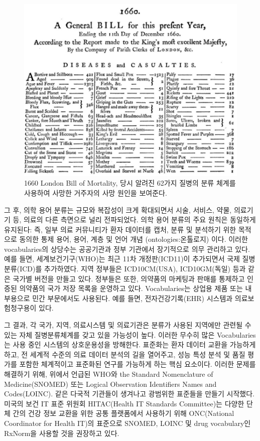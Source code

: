 \documentclass[11pt]{book}
\theoremstyle{definition}
\theoremstyle{definition}
\theoremstyle{definition}
\theoremstyle{remark}
\begin{document}
\begin{figure}

{\centering \includegraphics[width=1\linewidth]{images/StandardizedVocabularies/bill} 

}

\caption{1660 London Bill of Mortality, 당시 알려진 62가지 질병의 분류 체계를 사용하여 사망한 거주자의 사망 원인을 보여준다.}\label{fig:bill}
\end{figure}

그 후, 의학 용어 분류는 규모와 복잡성이 크게 확대되면서 시술, 서비스,
약물, 의료기기 등, 의료의 다른 측면으로 널리 전파되었다. 의학 용어
분류의 주요 원칙은 동일하게 유지된다: 즉, 일부 의료 커뮤니티가 환자
데이터를 캡처, 분류 및 분석하기 위한 목적으로 동의한 통제 용어, 용어,
계층 및 언어 개념 (ontologies:온톨로지) 이다. 이러한 vocabularies의
상당수는 공공기관과 정부 기관에서 장기적으로 의무 관리하고 있다. 예를
들면, 세계보건기구(WHO)는 최근 11차 개정판(ICD11)이 추가되면서 국제
질병분류(ICD)를 추가하였다. 지역 정부들은 ICD10CM(USA), ICD10GM(독일)
등과 같은 국가별 버전을 만들고 있다. 정부들은 또한, 의약품의 마케팅과
판매를 통제하고 인증된 의약품의 국가 저장 목록을 운영하고 있다.
Vocabularies는 상업용 제품 또는 내부용으로 민간 부문에서도 사용된다.
예를 들면, 전자건강기록(EHR) 시스템과 의료보험청구용이 있다.

그 결과, 각 국가, 지역, 의료시스템 및 의료기관은 분류가 사용된 지역에만
관련될 수 있는 자체 질병분류체계를 갖고 있을 가능성이 높다. 이러한
무수히 많은 Vocabularies는 사용 중인 시스템의 상호운용성을 방해한다.
표준화는 환자 데이터 교환을 가능하게 하고, 전 세계적 수준의 의료 데이터
분석의 길을 열어주고, 성능 특성 분석 및 품질 평가를 포함한 체계적이고
표준화된 연구를 가능하게 하는 핵심 요소이다. 이러한 문제를 해결하기
위해, 위에서 언급된 WHO와 the Standard Nomenclature of Medicine(SNOMED)
또는 Logical Observation Identifiers Names and Codes(LOINC). 같은 다국적
기관들이 생겨나고 광범위한 표준들을 만들기 시작했다. 미국의 보건 IT 표준
위원회 HITAC(Health IT Standards Committee)는 다양한 단체 간의 건강 정보
교환을 위한 공통 플랫폼에서 사용하기 위해 ONC(National Coordinator for
Health IT)의 표준으로 SNOMED, LOINC 및 drug vocabulary인 RxNorm을 사용할
것을 권장하고 있다.
\end{document}
